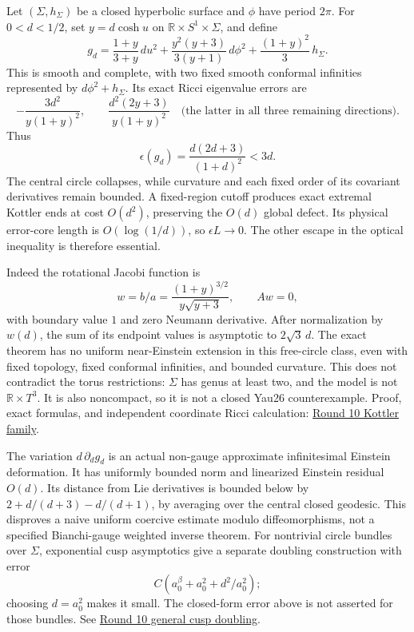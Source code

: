 \documentclass[
  english,
]{article}
\begin{document}
Let \((\Sigma,h_\Sigma)\) be a closed hyperbolic surface and \(\phi\)
have period \(2\pi\). For \(0<d<1/2\), set \(y=d\cosh u\) on
\(\mathbb R\times S^1\times\Sigma\), and define \[
 g_d=\frac{1+y}{3+y}\,du^2
 +\frac{y^2(y+3)}{3(y+1)}\,d\phi^2
 +\frac{(1+y)^2}{3}\,h_\Sigma.
\] This is smooth and complete, with two fixed smooth conformal
infinities represented by \(d\phi^2+h_\Sigma\). Its exact Ricci
eigenvalue errors are \[
 -\frac{3d^2}{y(1+y)^2},\qquad
 \frac{d^2(2y+3)}{y(1+y)^2}
 \quad\text{(the latter in all three remaining directions)}.
\] Thus \[
 \epsilon(g_d)=\frac{d(2d+3)}{(1+d)^2}<3d.
\] The central circle collapses, while curvature and each fixed order of
its covariant derivatives remain bounded. A fixed-region cutoff produces
exact extremal Kottler ends at cost \(O(d^2)\), preserving the \(O(d)\)
global defect. Its physical error-core length is \(O(\log(1/d))\), so
\(\epsilon L\to0\). The other escape in the optical inequality is
therefore essential.

Indeed the rotational Jacobi function is \[
 w=b/a=\frac{(1+y)^{3/2}}{y\sqrt{y+3}},\qquad Aw=0,
\] with boundary value \(1\) and zero Neumann derivative. After
normalization by \(w(d)\), the sum of its endpoint values is asymptotic
to \(2\sqrt3\,d\). The exact theorem has no uniform near-Einstein
extension in this free-circle class, even with fixed topology, fixed
conformal infinities, and bounded curvature. This does not contradict
the torus restrictions: \(\Sigma\) has genus at least two, and the model
is not \(\mathbb R\times T^3\). It is also noncompact, so it is not a
closed Yau26 counterexample. Proof, exact formulas, and independent
coordinate Ricci calculation: \href{../proofs/round10_kottler.md}{Round
10 Kottler family}.

The variation \(d\,\partial_dg_d\) is an actual non-gauge approximate
infinitesimal Einstein deformation. It has uniformly bounded norm and
linearized Einstein residual \(O(d)\). Its distance from Lie derivatives
is bounded below by \(2+d/(d+3)-d/(d+1)\), by averaging over the central
closed geodesic. This disproves a naive uniform coercive estimate modulo
diffeomorphisms, not a specified Bianchi-gauge weighted inverse theorem.
For nontrivial circle bundles over \(\Sigma\), exponential cusp
asymptotics give a separate doubling construction with error \[
 C(a_0^\beta+a_0^2+d^2/a_0^2);
\] choosing \(d=a_0^2\) makes it small. The closed-form error above is
not asserted for those bundles. See
\href{../proofs/round10_cusp_doubling.md}{Round 10 general cusp
doubling}.
\end{document}
